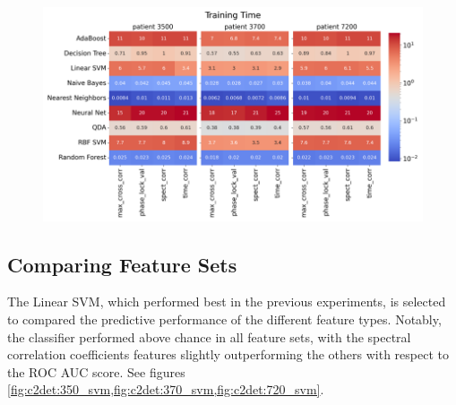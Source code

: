 \begin{figure}[tb]
    \centering
    \includegraphics[width=\textwidth]{c2Deterministic/Figs/PSP/training_time_classifiers_and_features.png}
    \label{fig:c2:training_times}
\end{figure}

\subsection{Comparing Feature Sets}
The Linear SVM, which performed best in the previous experiments, is selected to compared the predictive performance of the different feature types. Notably, the classifier performed above chance in all feature sets, with the spectral correlation coefficients features slightly outperforming the others with respect to the ROC AUC score. See figures \cref{fig:c2det:350_svm,fig:c2det:370_svm,fig:c2det:720_svm}.

